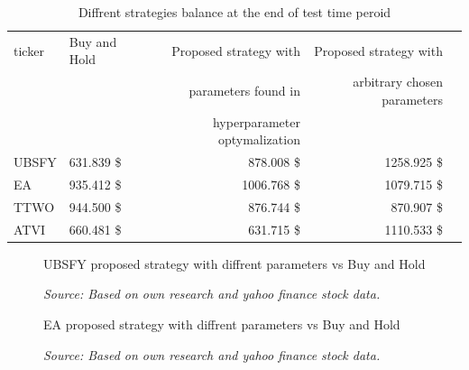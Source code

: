 \documentclass[11pt]{article} %
\begin{document}
\begin{table}[H]
\centering
\caption{Diffrent strategies balance at the end of test time peroid}
\begin{tabular}{llrrr}
\toprule
 ticker &  Buy and Hold &  Proposed strategy with  &  Proposed strategy with  \\
  &        &                                        parameters found in  &                                           arbitrary chosen parameters \\
  &        &                                         hyperparameter optymalization &                                            \\

 \midrule
  UBSFY &       631.839 \$&                                            878.008 \$ &                                           1258.925 \$\\
    EA &       935.412 \$&                                           1006.768 \$&                                           1079.715 \$\\
   TTWO &       944.500 \$&                                            876.744 \$&                                            870.907 \$\\
   ATVI &       660.481 \$&                                            631.715 \$&                                           1110.533 \$\\
\bottomrule
\end{tabular}
\end{table}



\begin{figure}[H]
\caption{UBSFY proposed strategy with diffrent parameters vs Buy and Hold}
\begin{adjustbox}{width=1.3\textwidth,center}

\end{adjustbox}
\caption*{\textit{Source: Based on own research and yahoo finance stock data.}}
\end{figure}

\begin{figure}[H]
\caption{EA proposed strategy with diffrent parameters vs Buy and Hold}
\begin{adjustbox}{width=1.3\textwidth,center}

\end{adjustbox}
\caption*{\textit{Source: Based on own research and yahoo finance stock data.}}
\end{figure}
\end{document}
